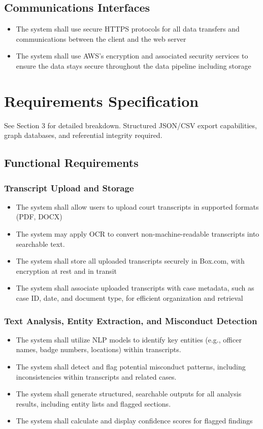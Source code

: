 \documentclass[12pt]{article}
\begin{document}
\subsection{Communications Interfaces}
\begin{itemize}
  \item The system shall use secure HTTPS protocols for all data transfers and communications
 between the client and the web server
  \item  The system shall use AWS’s encryption and associated security services to ensure the data
 stays secure throughout the data pipeline including storage

\end{itemize}

\section{Requirements Specification}
See Section 3 for detailed breakdown. Structured JSON/CSV export capabilities, graph databases, and referential integrity required.

\subsection{Functional Requirements}
\subsubsection{Transcript Upload and Storage}
\begin{itemize}
  \item  The system shall allow users to upload court transcripts in supported formats (PDF, DOCX)
  \item  The system may apply OCR to convert non-machine-readable transcripts into searchable text.
\item The system shall store all uploaded transcripts securely in Box.com, with encryption at rest
 and in transit
\item The system shall associate uploaded transcripts with case metadata, such as case ID, date,
 and document type, for efficient organization and retrieval
\end{itemize}

\subsubsection{Text Analysis, Entity Extraction, and Misconduct Detection}
\begin{itemize}
  \item   The system shall utilize NLP models to identify key entities (e.g., officer names, badge
 numbers, locations) within transcripts.
  \item  The system shall detect and flag potential misconduct patterns, including inconsistencies
 within transcripts and related cases.
\item  The system shall generate structured, searchable outputs for all analysis results, including
 entity lists and flagged sections.
\item The system shall calculate and display confidence scores for flagged findings
\end{itemize}
\end{document}
